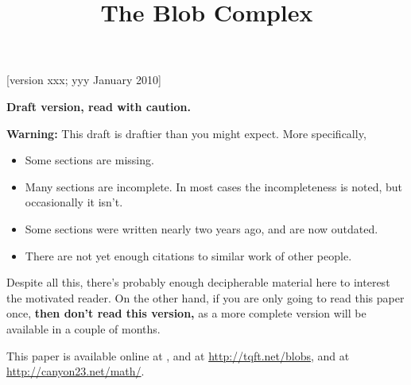 \documentclass[11pt,leqno]{amsart}
\title{The Blob Complex}
\begin{document}
\makeatletter
{}
\gdef\theequation{\thesection.\arabic{equation}}
\makeatother

\maketitle


[version xxx; yyy January 2010]

\textbf{Draft version, read with caution.}


\medskip

\noindent
{\bf Warning:} This draft is draftier than you might expect.
More specifically,
\begin{itemize}
\item Some sections are missing.
\item Many sections are incomplete.
In most cases the incompleteness is noted, but occasionally it isn't.
\item Some sections were written nearly two years ago, and are now outdated.
\item There are not yet enough citations to similar work of other people.
\end{itemize}
Despite all this, there's probably enough decipherable material
here to interest the motivated reader.
On the other hand, if you are only going to read this paper once,
{\bf then don't read this version,} as a more complete version will be available in a couple of months.






















\appendix







%




This paper is available online at , and at
\url{http://tqft.net/blobs},
and at \url{http://canyon23.net/math/}.

\end{document}
